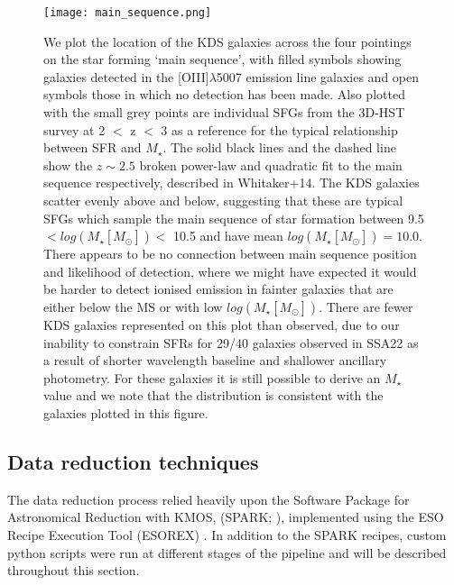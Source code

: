 \documentclass[fleqn,usenatbib]{mn2e}
\begin{document}
\begin{figure}
\centering
\texttt{[image: main\_sequence.png]}
\caption{We plot the location of the KDS galaxies across the four pointings on the star forming `main sequence', with filled symbols showing galaxies detected in the [OIII]$\lambda$5007 emission line galaxies and open symbols those in which no detection has been made. 
Also plotted with the small grey points are individual SFGs from the 3D-HST survey at 2 $<$ z $<$ 3 as a reference for the typical relationship between SFR and $M_{\star}$.
The solid black lines and the dashed line show the $z\sim2.5$ broken power-law and quadratic fit to the main sequence respectively, described in Whitaker+14.
The KDS galaxies scatter evenly above and below, suggesting that these are typical SFGs which sample the main sequence of star formation between 9.5 $< log(M_{\star}[M_{\odot}]) <$ 10.5 and have mean $log(M_{\star}[M_{\odot}]) = 10.0$.
There appears to be no connection between main sequence position and likelihood of detection, where we might have expected it would be harder to detect ionised emission in fainter galaxies that are either below the MS or with low $log(M_{\star}[M_{\odot}])$.
There are fewer KDS galaxies represented on this plot than observed, due to our inability to constrain SFRs for 29/40 galaxies observed in SSA22 as a result of shorter wavelength baseline and shallower ancillary photometry.
For these galaxies it is still possible to derive an $M_{\star}$ value and we note that the distribution is consistent with the galaxies plotted in this figure.}
\label{fig:main_sequence}
\end{figure}
\subsection{Data reduction techniques}\label{subsec:datareduction}
The data reduction process relied heavily upon the Software Package for Astronomical Reduction with KMOS, (SPARK; \cite{Davies2013}), implemented using the ESO Recipe Execution Tool (ESOREX) \citep{Freudling2013}.
In addition to the SPARK recipes, custom python scripts were run at different stages of the pipeline and will be described throughout this section.
\end{document}
